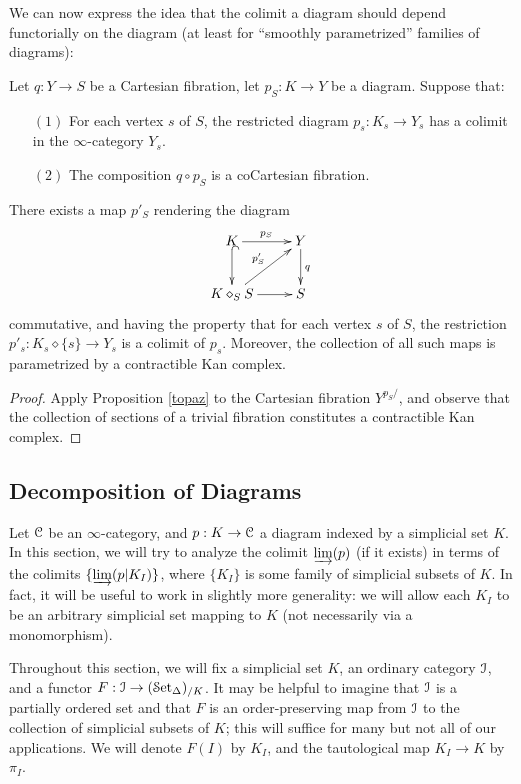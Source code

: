 We can now express the idea that the colimit a diagram should depend functorially on the diagram (at least for ``smoothly parametrized'' families of diagrams):

\begin{proposition}\label{familycolimit}
Let $q: Y \rightarrow S$ be a Cartesian fibration, let
$p_S: K \rightarrow Y$ be a diagram. Suppose that:
\begin{itemize}
\item[$(1)$] For each vertex $s$ of $S$, the restricted diagram $p_s: K_s \rightarrow Y_s$
has a colimit in the $\infty$-category $Y_s$.
\item[$(2)$] The composition $q \circ p_S$ is a coCartesian fibration.
\end{itemize}

There exists a map $p'_S$ rendering the diagram
$$ \xymatrix{ K \ar@{^{(}->}[d] \ar[r]^{p_S} & Y \ar[d]^{q} \\
K \diamond_S S \ar[ur]^{p'_S} \ar[r] & S }$$
commutative, and having the property that for each vertex $s$ of $S$, the restriction $p'_s: K_s \diamond \{s\} \rightarrow Y_s$ is a colimit of $p_s$.
Moreover, the collection of all such maps is parametrized by a contractible Kan complex.
\end{proposition}

\begin{proof}
Apply Proposition \ref{topaz} to the Cartesian fibration $Y^{p_S/}$, and observe that the collection of sections of a trivial fibration constitutes a contractible Kan complex.
\end{proof}

\subsection{Decomposition of Diagrams}\label{quasilimit1}
 
Let $\operatorname{\mathcal{C}}$ be an $\infty$-category, and $p: K \rightarrow \operatorname{\mathcal{C}}$ a diagram indexed by a simplicial set $K$. In this section, we will try to analyze the colimit $\operatorname{\varinjlim}(p)$ (if it exists) in terms of the colimits $\{ \operatorname{\varinjlim}(p | K_{I}) \}$, where $\{ K_{I} \}$ is some family of simplicial subsets of $K$. In fact, it will be useful to work in slightly more generality: we will allow each $K_{I}$ to be an arbitrary simplicial set mapping to $K$ (not necessarily via a monomorphism).

Throughout this section, we will fix a simplicial set $K$, an ordinary category $\operatorname{\mathcal{I}}$, and a functor
$F: \operatorname{\mathcal{I}} \rightarrow (\operatorname{\mathcal{S}et_{\Delta}})_{/K}$. It may be helpful to imagine that $\operatorname{\mathcal{I}}$
is a partially ordered set and that $F$ is an order-preserving map
from $\operatorname{\mathcal{I}}$ to the collection of simplicial subsets of $K$; this
will suffice for many but not all of our applications. We will
denote $F(I)$ by $K_I$, and the tautological map $K_I \rightarrow
K$ by $\pi_{I}$.

